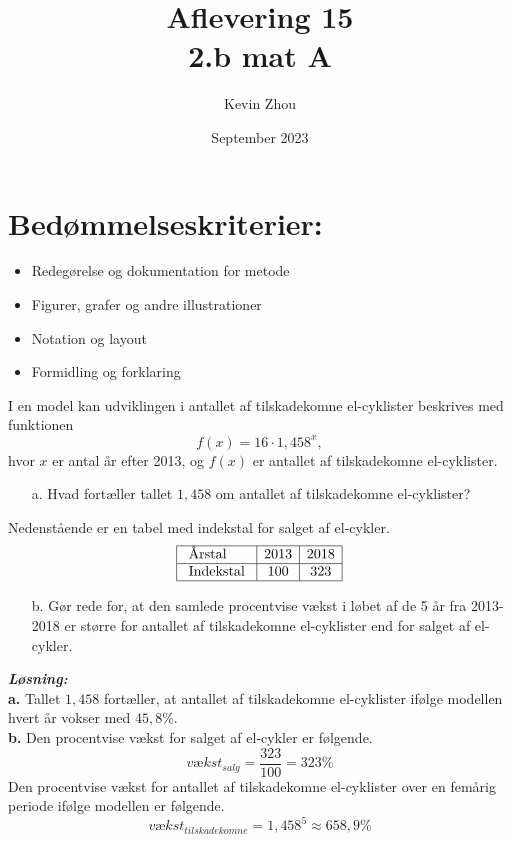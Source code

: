 \documentclass{article}
\title{Aflevering 15\\
{\Large \textbf{2.b mat A}}}
\author{Kevin Zhou}
\date{September 2023}
\newcommand{\sol}{\setlength{\parindent}{0cm}\textbf{\textit{Løsning:}}\setlength{\parindent}{1cm}}
\begin{document}
\maketitle
\section*{Bedømmelseskriterier:}
\begin{itemize}
    \setlength\itemsep{3cm}
    \Large
    \item  Redegørelse og dokumentation for metode
    \item Figurer, grafer og andre illustrationer
    \item Notation og layout
    \item Formidling og forklaring
\end{itemize}
\pagebreak
\begin{question}{}{}
  I en model kan udviklingen i antallet af tilskadekomne el-cyklister beskrives med funktionen
$$
f(x)=16 \cdot 1,458^x,
$$
hvor $x$ er antal år efter 2013, og $f(x)$ er antallet af tilskadekomne el-cyklister.
\begin{itemize}
  \item[a.] Hvad fortæller tallet $1,458$ om antallet af tilskadekomne el-cyklister? 
\end{itemize}
Nedenstående er en tabel med indekstal for salget af el-cykler.
$$
\begin{array}{|l|c|c|}
\hline \text { Årstal } & 2013 & 2018 \\
\hline \text { Indekstal } & 100 & 323 \\
\hline
\end{array}
$$
\begin{itemize}
  \item[b.] Gør rede for, at den samlede procentvise vækst i løbet af de 5 år fra 2013-2018 er større for antallet af tilskadekomne el-cyklister end for salget af el-cykler. 
\end{itemize}
\end{question}
\sol \\ 
\textbf{a.} Tallet $1,458$ fortæller, at antallet af tilskadekomne el-cyklister ifølge modellen hvert år vokser med $45,8\%$. \\[1ex]
\textbf{b.} Den procentvise vækst for salget af el-cykler er følgende.
\[
vækst_{salg} = \frac{323}{100}=323\%
\] 
Den procentvise vækst for antallet af tilskadekomne el-cyklister over en femårig periode ifølge modellen er følgende.
\[
vækst_{tilskadekomne} = 1,458^5 \approx 658,9 \%
\] 
\end{document}
